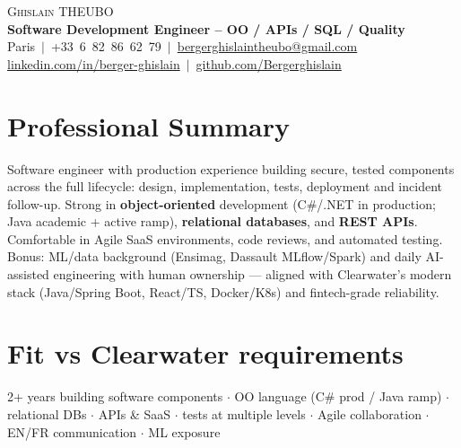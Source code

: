 \documentclass[letterpaper,10.5pt]{article}
\begin{document}
\begin{center}
{\Huge \scshape Ghislain THEUBO}\\[3pt]
\textbf{Software Development Engineer -- OO / APIs / SQL / Quality}\\[2pt]
\small Paris $\,|\,$ +33~6~82~86~62~79 $\,|\,$ \href{mailto:bergerghislaintheubo@gmail.com}{bergerghislaintheubo@gmail.com}\\[1pt]
\href{https://www.linkedin.com/in/berger-ghislain}{linkedin.com/in/berger-ghislain} $\,|\,$ \href{https://github.com/Bergerghislain}{github.com/Bergerghislain}
\end{center}

\section{Professional Summary}
\small{
Software engineer with production experience building secure, tested components across the full lifecycle:
design, implementation, tests, deployment and incident follow-up. Strong in \textbf{object-oriented} development
(C\#/.NET in production; Java academic + active ramp), \textbf{relational databases}, and \textbf{REST APIs}.
Comfortable in Agile SaaS environments, code reviews, and automated testing. Bonus: ML/data background
(Ensimag, Dassault MLflow/Spark) and daily AI-assisted engineering with human ownership --- aligned with
Clearwater's modern stack (Java/Spring Boot, React/TS, Docker/K8s) and fintech-grade reliability.
}

\section{Fit vs Clearwater requirements}
\small{
2+ years building software components $\cdot$ OO language (C\# prod / Java ramp) $\cdot$ relational DBs $\cdot$
APIs \& SaaS $\cdot$ tests at multiple levels $\cdot$ Agile collaboration $\cdot$ EN/FR communication $\cdot$ ML exposure
}
\end{document}
